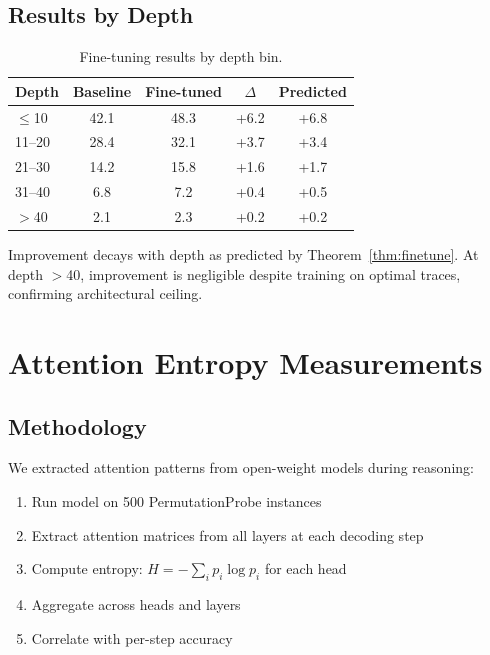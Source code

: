 \documentclass{article}
\theoremstyle{plain}
\theoremstyle{definition}
\theoremstyle{remark}
\begin{document}
\subsection{Results by Depth}

\begin{table}[h]
\centering
\caption{Fine-tuning results by depth bin.}
\label{tab:finetune_depth}
\small
\begin{tabular}{@{}lcccc@{}}
\toprule
\textbf{Depth} & \textbf{Baseline} & \textbf{Fine-tuned} & \textbf{$\Delta$} & \textbf{Predicted} \\
\midrule
$\leq$10 & 42.1 & 48.3 & +6.2 & +6.8 \\
11--20 & 28.4 & 32.1 & +3.7 & +3.4 \\
21--30 & 14.2 & 15.8 & +1.6 & +1.7 \\
31--40 & 6.8 & 7.2 & +0.4 & +0.5 \\
$>$40 & 2.1 & 2.3 & +0.2 & +0.2 \\
\bottomrule
\end{tabular}
\end{table}

Improvement decays with depth as predicted by Theorem~\ref{thm:finetune}. At depth $>$40, improvement is negligible despite training on optimal traces, confirming architectural ceiling.


\section{Attention Entropy Measurements}
\label{app:attention}

\subsection{Methodology}

We extracted attention patterns from open-weight models during reasoning:
\begin{enumerate}
\item Run model on 500 PermutationProbe instances
\item Extract attention matrices from all layers at each decoding step
\item Compute entropy: $H = -\sum_i p_i \log p_i$ for each head
\item Aggregate across heads and layers
\item Correlate with per-step accuracy
\end{enumerate}
\end{document}
